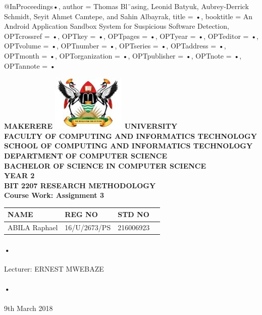 \documentclass[12pt]{article}
\begin{document}
\begin{Huge}
@InProceedings{•,
author = {Thomas Bl¨asing, Leonid Batyuk, Aubrey-Derrick Schmidt, Seyit Ahmet Camtepe, and Sahin Albayrak},
title = {•},
booktitle = {An Android Application Sandbox System for Suspicious Software Detection},
OPTcrossref = {•},
OPTkey = {•},
OPTpages = {•},
OPTyear = {•},
OPTeditor = {•},
OPTvolume = {•},
OPTnumber = {•},
OPTseries = {•},
OPTaddress = {•},
OPTmonth = {•},
OPTorganization = {•},
OPTpublisher = {•},
OPTnote = {•},
OPTannote = {•}
}
\begin{center}
\begin{normalsize}
\textbf{MAKERERE \includegraphics[scale=0.5]{logo} UNIVERSITY }\\


\textbf{FACULTY OF COMPUTING AND INFORMATICS TECHNOLOGY} \\
\textbf{SCHOOL OF COMPUTING AND INFORMATICS TECHNOLOGY} \\
\textbf{DEPARTMENT OF COMPUTER SCIENCE} \\
\textbf{BACHELOR OF SCIENCE IN COMPUTER SCIENCE} \\
\textbf{YEAR 2} \\
\textbf{BIT 2207 RESEARCH METHODOLOGY} \\
\textbf{Course Work: Assignment 3}\\
\end{normalsize}
\end{center}
\end{Huge}

\begin{center}
\begin{tabular}{|l|l|l|c|}
\hline NAME  & REG NO & STD NO \\\hline
ABILA Raphael& 16/U/2673/PS & 216006923 \\\hline

\end{tabular}
\paragraph{•}
Lecturer: ERNEST MWEBAZE \\
\paragraph{•}
9th March 2018

\end{center}
\end{document}
